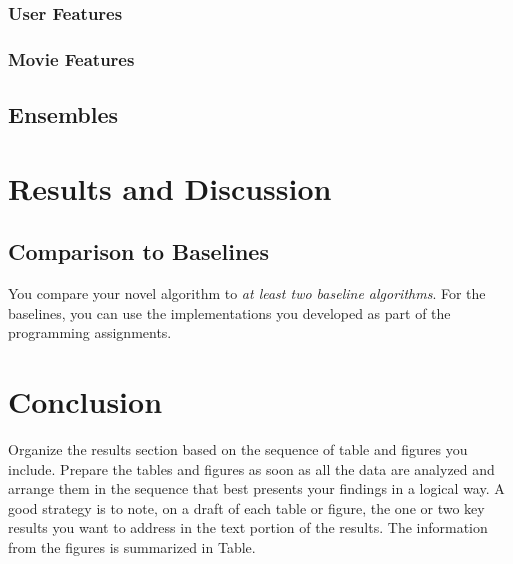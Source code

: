 \documentclass[10pt,conference,compsocconf]{IEEEtran}
\begin{document}
    \subsubsection{User Features}
    \cite{lee_improving_2017}


    \subsubsection{Movie Features}

    \subsection{Ensembles}


    \section{Results and Discussion}

    \subsection{Comparison to Baselines}

    You compare your novel algorithm to \emph{at least two baseline
    algorithms}. For the baselines, you can use the implementations you
    developed as part of the programming assignments.


    \section{Conclusion}

    Organize the results section based on the sequence of table and
    figures you include. Prepare the tables and figures as soon as all
    the data are analyzed and arrange them in the sequence that best
    presents your findings in a logical way. A good strategy is to note,
    on a draft of each table or figure, the one or two key results you
    want to address in the text portion of the results.
    The information from the figures is
    summarized in Table.\cite{anderson04}




    
    
\end{document}
